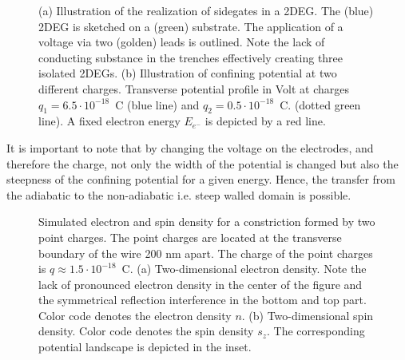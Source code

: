 \begin{figure}[h]
  \caption{(a) Illustration of the realization of sidegates in a 2DEG. The (blue) 2DEG is sketched on a (green) substrate. The application of a voltage via two (golden) leads is outlined. Note the lack of conducting substance in the trenches effectively creating three isolated 2DEGs. (b) Illustration of confining potential at two different charges. Transverse potential profile in Volt at charges $q_1 = 6.5 \cdot 10^{-18}$~C (blue line) and $q_2= 0.5 \cdot 10^{-18}$~C. (dotted green line). A fixed electron energy $E_{e^-}$ is depicted by a red line.} 
\end{figure}
It is important to note that by changing the voltage on the electrodes, and therefore the charge, not only the width of the potential is changed but also the steepness of the confining potential for a given energy. Hence, the transfer from the adiabatic to the non-adiabatic i.e. steep walled domain is possible.\par
\begin{figure}[h]
  \hspace{14pt}
  \hspace{4pt}
  \caption{Simulated electron and spin density for a constriction formed by two point charges. The point charges are located at the transverse boundary of the wire 200 nm apart. The charge of the point charges is $q\approx 1.5\cdot 10^{-18}$~C. (a) Two-dimensional electron density. Note the lack of pronounced electron density in the center of the figure and the symmetrical reflection interference in the bottom and top part. Color code denotes the electron density $n$. (b) Two-dimensional spin density. Color code denotes the spin density $s_z$. The corresponding potential landscape is depicted in the inset.}
\end{figure}
